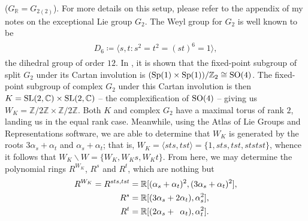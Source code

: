 \noindent\begin{example}\textup{($G_\mathbb{R} = G_{2(2)}$).} For more details on this setup, please refer to the appendix of my notes on the exceptional Lie group $G_2$. The Weyl group for $G_2$ is well known to be
\begin{align*}
\begin{split}
D_6 \coloneqq \langle s, t : s^2 = t^2 = (st)^6 = 1\rangle,
\end{split}
\end{align*}
\noindent the dihedral group of order $12$. In \cite[Theorem 1.10.1]{Yok25}, it is shown that the fixed-point subgroup of split $G_2$ under its Cartan involution is $(\textup{Sp}(1) \times \textup{Sp}(1))/\mathbb{Z}_2 \cong \textup{SO}(4)$. The fixed-point subgroup of complex $G_2$ under this Cartan involution is then $K = \textup{SL}(2, \mathbb{C}) \times \textup{SL}(2, \mathbb{C})$ -- the complexification of $\textup{SO}(4)$ -- giving us $W_K = \mathbb{Z}/2\mathbb{Z} \times \mathbb{Z}/2\mathbb{Z}$. Both $K$ and complex $G_2$ have a maximal torus of rank $2$, landing us in the equal rank case. Meanwhile, using the Atlas of Lie Groups and Representations software, we are able to determine that $W_K$ is generated by the roots $3\alpha_s+\alpha_t$ and $\alpha_s+\alpha_t$; that is, $W_K = \langle sts, tst\rangle = \{1, sts, tst, ststst\}$, whence it follows that $W_K\backslash W = \{W_K, W_Ks, W_Kt\}$. From here, we may determine the polynomial rings $R^{W_K}$, $R^s$ and $R^t$, which are nothing but
\begin{align*}
\begin{split}
R^{W_K} = R^{sts,tst} &= \mathbb{R}[(\alpha_s+\alpha_t)^2, (3\alpha_s+\alpha_t)^2],\\%
R^s &= \mathbb{R}[(3\alpha_s+2\alpha_t), \alpha_s^2],\\ 
R^t &= \mathbb{R}[(2\alpha_s+\hphantom{2}\alpha_t), \alpha_t^2].
\end{split}
\end{align*}

\end{example}
